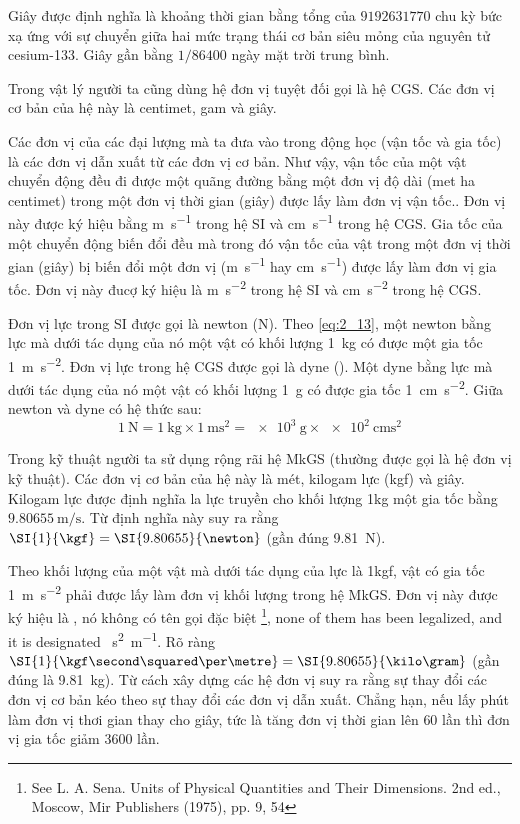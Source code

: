 Giây được định nghĩa là khoảng thời gian bằng tổng của $9192631770$ chu kỳ bức xạ ứng với sự chuyển giữa hai mức trạng thái cơ bản siêu mỏng của nguyên tử cesium-133. Giây gần bằng $1/86400$ ngày mặt trời trung bình.

Trong vật lý người ta cũng dùng hệ đơn vị tuyệt đối gọi là hệ CGS. Các đơn vị cơ bản của hệ này là centimet, gam và giây.

Các đơn vị của các đại lượng mà ta đưa vào trong động học (vận tốc và gia tốc) là các đơn vị dẫn xuất từ các đơn vị cơ bản. Như vậy, vận tốc của một vật chuyển động đều đi được một quãng đường bằng một đơn vị độ dài (met ha centimet) trong một đơn vị thời gian (giây) được lấy làm đơn vị vận tốc.. Đơn vị này được ký hiệu bằng \si{\metre\per\second} trong hệ SI và \si{\centi\metre\per\second} trong hệ CGS. Gia tốc của một chuyển động biến đổi đều mà trong đó vận tốc của vật trong một đơn vị thời gian (giây) bị biến đổi một đơn vị (\si{\metre\per\second} hay \si{\centi\metre\per\second}) được lấy làm đơn vị gia tốc. Đơn vị này đucợ ký hiệu là \si{\metre\per\square\second} trong hệ SI và \si{\centi\metre\per\square\second} trong hệ CGS.

Đơn vị lực trong SI được gọi là newton (\si{\newton}). Theo \eqref{eq:2_13}, một newton bằng lực mà dưới tác dụng của nó một vật có khối lượng \SI{1}{\kilo\gram} có được một gia tốc \SI{1}{\metre\per\square\second}. Đơn vị lực trong hệ CGS được gọi là dyne (\si{\dyne}). Một dyne bằng lực mà dưới tác dụng của nó một vật có khối lượng \SI{1}{\gram} có được gia tốc \SI{1}{\centi\metre\per\square\second}. Giữa newton và dyne có hệ thức sau:
\begin{equation*}
\SI{1}{\newton} = \SI{1}{\kilo\gram} \times \SI{1}{\metre\square\second} = \SI{e3}{\gram} \times \SI{e2}{\centi\metre\square\second}
\end{equation*}

Trong kỹ thuật người ta sử dụng rộng rãi hệ MkGS (thường được gọi là hệ đơn vị kỹ thuật). Các đơn vị cơ bản của hệ này là mét, kilogam lực (kgf) và giây. Kilogam lực được định nghĩa la lực truyền cho khối lượng 1kg một gia tốc bằng $\SI{9.80655}{\metre\per\second}$. Từ định nghĩa này suy ra rằng $\SI{1}{\kgf}=\SI{9.80655}{\newton}$ (gần đúng \SI{9.81}{\newton}).

Theo  khối lượng của một vật mà dưới tác dụng của lực là 1kgf, vật có gia tốc \SI{1}{\metre\per\square\second} phải được lấy làm đơn vị khối lượng trong hệ MkGS. Đơn vị này được ký hiệu là {\kgf\second\squared\per\metre}, nó không có tên gọi đặc biệt \footnote{See L. A. Sena. Units of Physical Quantities and Their Dimensions. 2nd ed., Moscow, Mir Publishers (1975), pp. 9, 54}, none of them has been legalized, and it is designated \si{\kgf\second\squared\per\metre}. Rõ ràng $\SI{1}{\kgf\second\squared\per\metre}=\SI{9.80655}{\kilo\gram}$ (gần đúng là \SI{9.81}{\kilo\gram}).
Từ cách xây dựng các hệ đơn vị suy ra rằng sự thay đổi các đơn vị cơ bản kéo theo sự thay đổi các đơn vị dẫn xuất. Chẳng hạn, nếu lấy phút làm đơn vị thơi gian thay cho giây, tức là tăng đơn vị thời gian lên $60$ lần thì đơn vị gia tốc giảm $3600$ lần.

